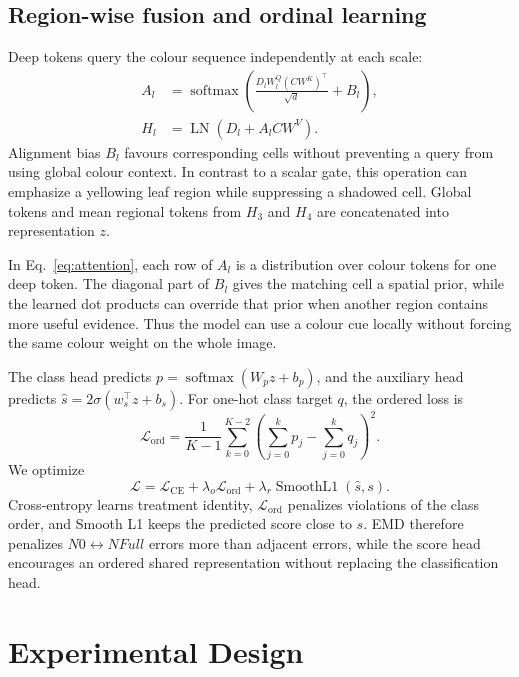 \documentclass[conference]{IEEEtran}
\begin{document}
\subsection{Region-wise fusion and ordinal learning}
Deep tokens query the colour sequence independently at each scale:
\begin{align}
A_l&=\operatorname{softmax}\!\left(
  \frac{D_lW_l^Q(CW^K)^\top}{\sqrt d}+B_l\right),\nonumber\\
H_l&=\operatorname{LN}\!\left(D_l+A_lCW^V\right).
\label{eq:attention}
\end{align}
Alignment bias $B_l$ favours corresponding cells without preventing a query from using global colour context. In contrast to a scalar gate, this operation can emphasize a yellowing leaf region while suppressing a shadowed cell. Global tokens and mean regional tokens from $H_3$ and $H_4$ are concatenated into representation $z$.

In Eq.~\ref{eq:attention}, each row of $A_l$ is a distribution over colour tokens for one deep token. The diagonal part of $B_l$ gives the matching cell a spatial prior, while the learned dot products can override that prior when another region contains more useful evidence. Thus the model can use a colour cue locally without forcing the same colour weight on the whole image.

The class head predicts $p=\operatorname{softmax}(W_pz+b_p)$, and the auxiliary head predicts $\hat{s}=2\sigma(w_s^\top z+b_s)$. For one-hot class target $q$, the ordered loss is
\begin{equation}
\mathcal{L}_{\mathrm{ord}}=\frac{1}{K-1}\sum_{k=0}^{K-2}
\left(\sum_{j=0}^{k}p_j-\sum_{j=0}^{k}q_j\right)^2.
\end{equation}
We optimize
\begin{equation}
\mathcal{L}=\mathcal{L}_{\mathrm{CE}}+
\lambda_o\mathcal{L}_{\mathrm{ord}}+
\lambda_r\operatorname{SmoothL1}(\hat{s},s).
\label{eq:objective}
\end{equation}
Cross-entropy learns treatment identity, $\mathcal{L}_{\mathrm{ord}}$ penalizes violations of the class order, and Smooth L1 keeps the predicted score close to $s$. EMD therefore penalizes $N0\leftrightarrow NFull$ errors more than adjacent errors, while the score head encourages an ordered shared representation without replacing the classification head.

\section{Experimental Design}
\end{document}
